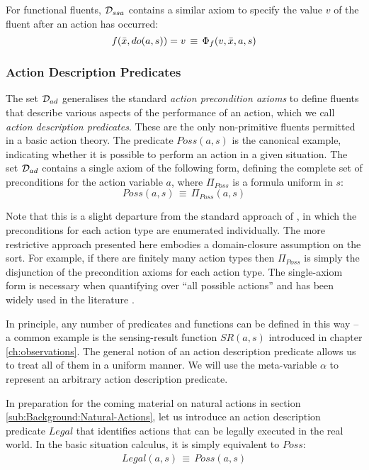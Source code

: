For functional fluents, $\mathcal{D}_{ssa}$ contains a similar axiom to specify
the value $v$ of the fluent after an action has occurred:\[
f(\bar{x},do(a,s))=v\,\equiv\,\Phi_{f}(v,\bar{x},a,s)\]



\subsubsection{Action Description Predicates}

The set $\mathcal{D}_{ad}$ generalises the standard \emph{action precondition
axioms} \citep{pirri99contributions_sitcalc} to define fluents that
describe various aspects of the performance of an action, which we
call \emph{action description predicates}. These are the only non-primitive
fluents permitted in a basic action theory. The predicate $Poss(a,s)$
is the canonical example, indicating whether it is possible to perform
an action in a given situation. The set $\mathcal{D}_{ad}$ contains a single
axiom of the following form, defining the complete set of preconditions
for the action variable $a$, where $\Pi_{Poss}$ is a formula uniform
in $s$:\[
Poss(a,s)\,\equiv\,\Pi_{Poss}(a,s)\]


Note that this is a slight departure from the standard approach of
\citep{pirri99contributions_sitcalc}, in which the preconditions
for each action type are enumerated individually. The more restrictive
approach presented here embodies a domain-closure assumption on the
 sort. For example, if there are finitely many action
types then $\Pi_{Poss}$ is simply the disjunction of the precondition
axioms for each action type. The single-axiom form is necessary when
quantifying over {}``all possible actions'' and has been widely
used in the literature \citep{vassos08progression_future_queries,savelli06sc_quantum_levels}.

In principle, any number of predicates and functions can be defined
in this way -- a common example is the sensing-result function $SR(a,s)$
introduced in chapter \ref{ch:observations}. The general notion of
an action description predicate allows us to treat all of them in
a uniform manner. We will use the meta-variable $\alpha$ to represent
an arbitrary action description predicate.

In preparation for the coming material on natural actions in section
\ref{sub:Background:Natural-Actions}, let us introduce an action
description predicate $Legal$ that identifies actions that can be
legally executed in the real world. In the basic situation calculus,
it is simply equivalent to $Poss$:\begin{gather*}
Legal(a,s)\,\equiv\, Poss(a,s)\end{gather*}


